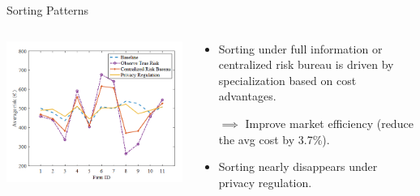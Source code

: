 \documentclass[10pt,aspectratio=169]{beamer}
\begin{document}
\begin{frame}{Sorting Patterns}
    \begin{columns}[T]
        \begin{column}{0.6\textwidth}
            \centering
            \includegraphics[width=.9\linewidth]{Figures/Fig6.png}
        \end{column}
        
        \begin{column}{0.4\textwidth}
            \begin{itemize}
                \item Sorting under full information or centralized risk bureau is driven by specialization based on cost advantages.
                
                \medskip
                $\implies$ Improve market efficiency (reduce the avg cost by 3.7\%).
                
                \medskip
                \item Sorting nearly disappears under privacy regulation.
            \end{itemize}
        \end{column}
    \end{columns}
\end{frame}
\end{document}
